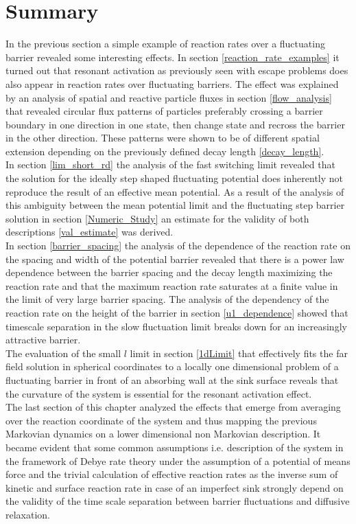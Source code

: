 \section{Summary}
In the previous section a simple example of reaction rates over a fluctuating barrier revealed some interesting effects. In section \ref{reaction_rate_examples} it turned out that resonant activation as previously seen with escape problems does also appear in reaction rates over fluctuating barriers. The effect was explained by an analysis of spatial and reactive particle fluxes in section \ref{flow_analysis} that revealed circular flux patterns of particles preferably crossing a barrier boundary in one direction in one state, then change state and recross the barrier in the other direction. These patterns were shown to be of different spatial extension depending on the previously defined decay length \eqref{decay_length}.  \\
In section \ref{lim_short_rd} the analysis of the fast switching limit revealed that the solution for the ideally step shaped fluctuating potential does inherently not reproduce the result of an effective mean potential. As a result of the analysis of this ambiguity between the mean potential limit and the fluctuating step barrier solution in section \ref{Numeric_Study} an estimate for the validity of both descriptions \eqref{val_estimate} was derived.\\
In section \ref{barrier_spacing} the analysis of the dependence of the reaction rate on the spacing and width of the potential barrier revealed that there is a power law dependence between the barrier spacing and the decay length maximizing the reaction rate and that the maximum reaction rate saturates at a finite value in the limit of very large barrier spacing. The analysis of the dependency of the reaction rate on the height of the barrier in section \ref{u1_dependence} showed that timescale separation in the slow fluctuation limit breaks down for an increasingly attractive barrier. \\
The evaluation of the small $l$ limit in section \ref{1dLimit} that effectively fits the far field solution in spherical coordinates to a locally one dimensional problem of a fluctuating barrier in front of an absorbing wall at the sink surface reveals that the curvature of the system is essential for the resonant activation effect.\\
The last section of this chapter analyzed the effects that emerge from averaging over the reaction coordinate of the system and thus mapping the previous Markovian dynamics on a lower dimensional non Markovian description. It became evident that some common assumptions i.e. description of the system in the framework of Debye rate theory under the assumption of a potential of means force and the trivial calculation of effective reaction rates as the inverse sum of kinetic and surface reaction rate in case of an imperfect sink strongly depend on the validity of the time scale separation between barrier fluctuations and diffusive relaxation.  

